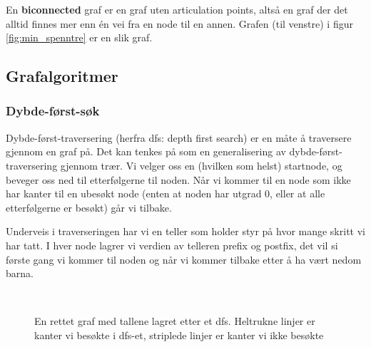 En \textbf{biconnected} graf er en graf uten articulation points, altså en graf der det alltid finnes mer enn én vei fra en node til en annen. Grafen (til venstre) i figur \ref{fig:min_spenntre} er en slik graf. 

\subsection{Grafalgoritmer}

\subsubsection{Dybde-først-søk}
\label{dfs}
Dybde-først-traversering (herfra dfs: depth first search) er en måte å traversere gjennom en graf på. Det kan tenkes på som en generalisering av dybde-først-traversering gjennom trær. Vi velger oss en (hvilken som helst) startnode, og beveger oss ned til etterfølgerne til noden. Når vi kommer til en node som ikke har kanter til en ubesøkt node (enten at noden har utgrad 0, eller at alle etterfølgerne er besøkt) går vi tilbake. 

Underveis i traverseringen har vi en teller som holder styr på hvor mange skritt vi har tatt. I hver node lagrer vi verdien av telleren prefix og postfix, det vil si første gang vi kommer til noden og når vi kommer tilbake etter å ha vært nedom barna. 

\begin{figure}[H]
\centering
\captionsetup{justification=centering,margin=1cm}
\caption{En rettet graf med tallene lagret etter et dfs. Heltrukne linjer er kanter vi besøkte i dfs-et, striplede linjer er kanter vi ikke besøkte}~\\
\label{fig:dfs}
\end{figure}

